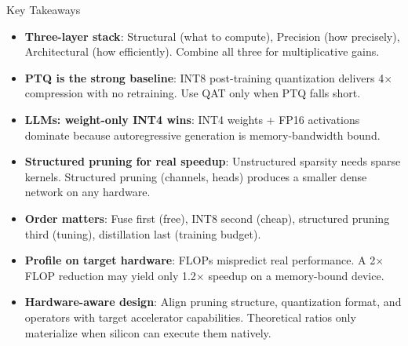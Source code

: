 \documentclass[aspectratio=169, 12pt]{beamer}
\begin{document}
\begin{frame}{Key Takeaways}

\scriptsize
\begin{itemize}\setlength\itemsep{1pt}
  \item \textbf{Three-layer stack}: Structural (what to compute), Precision (how precisely), Architectural (how efficiently). Combine all three for multiplicative gains.
  \item \textbf{PTQ is the strong baseline}: INT8 post-training quantization delivers 4$\times$ compression with no retraining. Use QAT only when PTQ falls short.
  \item \textbf{LLMs: weight-only INT4 wins}: INT4 weights + FP16 activations dominate because autoregressive generation is memory-bandwidth bound.
  \item \textbf{Structured pruning for real speedup}: Unstructured sparsity needs sparse kernels. Structured pruning (channels, heads) produces a smaller dense network on any hardware.
  \item \textbf{Order matters}: Fuse first (free), INT8 second (cheap), structured pruning third (tuning), distillation last (training budget).
  \item \textbf{Profile on target hardware}: FLOPs mispredict real performance. A 2$\times$ FLOP reduction may yield only 1.2$\times$ speedup on a memory-bound device.
  \item \textbf{Hardware-aware design}: Align pruning structure, quantization format, and operators with target accelerator capabilities. Theoretical ratios only materialize when silicon can execute them natively.
\end{itemize}

\end{frame}
\end{document}
